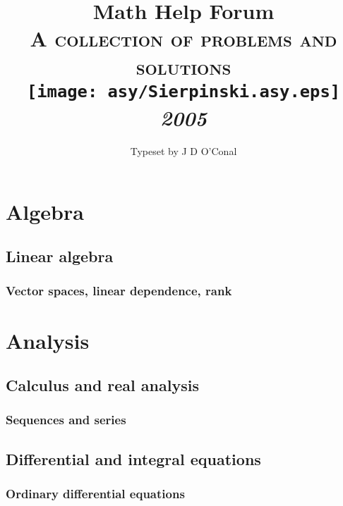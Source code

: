 \documentclass[a4paper]{book}
\makeatletter
\renewcommand\tableofcontents{%
    \if@twocolumn
      \@restonecoltrue\onecolumn
    \else
      \@restonecolfalse
    \fi
    \chapter*{\contentsname}%
        \@mkboth{%
           \MakeUppercase\contentsname}{\MakeUppercase\contentsname}%
    \@starttoc{toc}%
    \if@restonecol\twocolumn\fi
    }
\makeatother
\begin{document}
    \title{Math Help Forum\\\vspace{12pt}\Large\textsc{A collection of problems and solutions}\\\vspace{24pt}\texttt{[image: asy/Sierpinski.asy.eps]}\\\vspace{24pt}\Huge\textit{2005}}
    \author{Typeset by J D O'Conal}
    \date{}

    \maketitle

    \tableofcontents

	\part{Algebra}

	\chapter{Linear algebra}

	\section{Vector spaces, linear dependence, rank}

	

	\part{Analysis}

    \chapter{Calculus and real analysis}

    \section{Sequences and series}

	\chapter{Differential and integral equations}

    \section{Ordinary differential equations}
\end{document}
